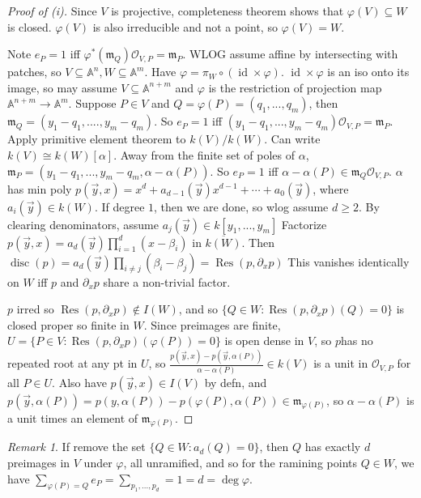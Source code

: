 \documentclass{article}
\theoremstyle{definition}
\theoremstyle{remark}
\newtheorem{rem}{Remark}
\theoremstyle{plain}
\newcommand{\bA}{\mathbb{A}}
\newcommand{\id}{\operatorname{id}}
\newcommand{\Res}{\operatorname{Res}}
\begin{document}
\begin{proof}[Proof of (i)]
    Since $V$ is projective, completeness theorem shows that $\varphi(V)\subseteq W$ is closed. $\varphi(V)$ is also irreducible and not a point, so $\varphi(V)=W$.

    Note $e_P=1$ iff $\varphi^\ast(\mathfrak m_Q)\mathcal O_{V,P}=\mathfrak m_P$. WLOG assume affine by intersecting with patches, so $V\subseteq \bA^n, W\subseteq \bA^m$. Have $\varphi=\pi_W\circ(\id\times\varphi)$. $\id\times \varphi$ is an iso onto its image, so may assume $V\subseteq \bA^{n+m}$ and $\varphi$ is the restriction of projection map $\bA^{n+m}\to\bA^m$. Suppose $P\in V$ and $Q=\varphi(P)=(q_1,...,q_m)$, then $\mathfrak m_Q=(y_1-q_1,....,y_m-q_m)$. So $e_P=1$ iff $(y_1-q_1,...,y_m-q_m)\mathcal O_{V,P}=\mathfrak m_P$. Apply primitive element theorem to $k(V)/k(W)$. Can write $k(V)\cong k(W)[\alpha]$. 
    Away from the finite set of poles of $\alpha$, $\mathfrak m_P=(y_1-q_1,...,y_m-q_m,\alpha-\alpha(P))$. So $e_P=1$ iff $\alpha-\alpha(P)\in \mathfrak m_Q\mathcal O_{V,P}$. $\alpha$ has min poly $p(\vec y,x)=x^d+a_{d-1}(\vec y)x^{d-1}+\cdots+a_0(\vec y)$, where $a_i(\vec y)\in k(W)$. If degree $1$, then we are done, so wlog assume $d\ge 2$. By clearing denominators, assume $a_j(\vec y)\in k[y_1,...,y_m]$ Factorize $p(\vec y,x)=a_d(\vec y)\prod_{i=1}^d(x-\beta_i)$ in $\overline{k(W)}$. Then $\operatorname{disc}(p)=a_d(\vec y)\prod_{i\neq j}(\beta_i-\beta_j)=\operatorname{Res}(p,\partial_xp)$ This vanishes identically on $W$ iff $p$ and $\partial_xp$ share a non-trivial factor. %

    $p$ irred so $\Res(p,\partial_xp)\notin I(W)$, and so $\{Q\in W:\Res(p,\partial_xp)(Q)=0\}$ is closed proper so finite in $W$. Since preimages are finite, $U=\{P\in V:\Res(p,\partial_xp)(\varphi(P))=0\}$ is open dense in $V$, so $p$has no repeated root at any pt in $U$, so $\frac{p(\vec y,x)-p(\vec y,\alpha(P))}{\alpha-\alpha(P)}\in k(V)$ is a unit in $\mathcal O_{V,P}$ for all $P\in U$. Also have $p(\vec y,x)\in I(V)$ by defn, and $p(\vec y,\alpha(P))=p(y,\alpha(P))-p(\varphi(P),\alpha(P))\in\mathfrak m_{\varphi(P)}$, so $\alpha-\alpha(P)$ is a unit times an element of $\mathfrak m_{\varphi(P)}$.
\end{proof}
\begin{rem}
    If remove the set $\{Q\in W:a_d(Q)=0\}$, then $Q$ has exactly $d$ preimages in $V$ under $\varphi$, all unramified, and so for the ramining points $Q\in W$, we have $\sum_{\varphi(P)=Q}e_P=\sum_{p_1,...,p_d}=1=d=\deg\varphi$.
\end{rem}
\end{document}
